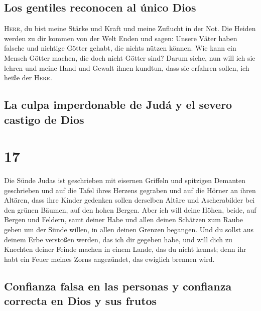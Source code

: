 \hypertarget{los-gentiles-reconocen-al-uxfanico-dios}{%
\subsection{Los gentiles reconocen al único
Dios}\label{los-gentiles-reconocen-al-uxfanico-dios}}

 \textsc{Herr}, du bist meine Stärke und Kraft und meine
Zuflucht in der Not. Die Heiden werden zu dir kommen von der Welt Enden
und sagen: Unsere Väter haben falsche und nichtige Götter gehabt, die
nichts nützen können.  Wie kann ein Mensch Götter machen,
die doch nicht Götter sind?  Darum siehe, nun will ich
sie lehren und meine Hand und Gewalt ihnen kundtun, dass sie erfahren
sollen, ich heiße der \textsc{Herr}.

\hypertarget{la-culpa-imperdonable-de-juduxe1-y-el-severo-castigo-de-dios}{%
\subsection{La culpa imperdonable de Judá y el severo castigo de
Dios}\label{la-culpa-imperdonable-de-juduxe1-y-el-severo-castigo-de-dios}}

\hypertarget{section-16}{%
\section{17}\label{section-16}}

 Die Sünde Judas ist geschrieben mit eisernen Griffeln und
spitzigen Demanten geschrieben und auf die Tafel ihres Herzens gegraben
und auf die Hörner an ihren Altären,  dass ihre Kinder
gedenken sollen derselben Altäre und Ascherabilder bei den grünen
Bäumen, auf den hohen Bergen.  Aber ich will deine Höhen,
beide, auf Bergen und Feldern, samt deiner Habe und allen deinen
Schätzen zum Raube geben um der Sünde willen, in allen deinen Grenzen
begangen.  Und du sollst aus deinem Erbe verstoßen werden,
das ich dir gegeben habe, und will dich zu Knechten deiner Feinde machen
in einem Lande, das du nicht kennst; denn ihr habt ein Feuer meines
Zorns angezündet, das ewiglich brennen wird.

\hypertarget{confianza-falsa-en-las-personas-y-confianza-correcta-en-dios-y-sus-frutos}{%
\subsection{Confianza falsa en las personas y confianza correcta en Dios
y sus
frutos}\label{confianza-falsa-en-las-personas-y-confianza-correcta-en-dios-y-sus-frutos}}

